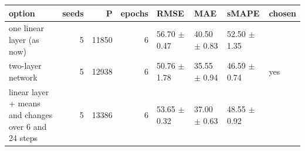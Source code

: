 \begin{tabular}{lrrrllll}
\toprule
option & seeds & P & epochs & RMSE & MAE & sMAPE & chosen \\
\midrule
one linear layer (as now) & 5 & 11850 & 6 & 56.70 $\pm$ 0.47 & 40.50 $\pm$ 0.83 & 52.50 $\pm$ 1.35 &  \\
two-layer network & 5 & 12938 & 6 & 50.76 $\pm$ 1.78 & 35.55 $\pm$ 0.94 & 46.59 $\pm$ 0.74 & yes \\
linear layer + means and changes over 6 and 24 steps & 5 & 13386 & 6 & 53.65 $\pm$ 0.32 & 37.00 $\pm$ 0.63 & 48.55 $\pm$ 0.92 &  \\
\bottomrule
\end{tabular}
